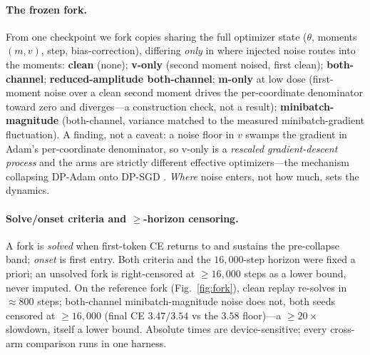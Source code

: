\documentclass[10pt]{article}
\begin{document}
\paragraph{The frozen fork.}
From one checkpoint we fork copies sharing the full optimizer state ($\theta$, moments $(m,v)$, step, bias-correction), differing \emph{only} in where injected noise routes into the moments: \textbf{clean} (none); \textbf{v-only} (second moment noised, first clean); \textbf{both-channel}; \textbf{reduced-amplitude both-channel}; \textbf{m-only} at low dose (first-moment noise over a clean second moment drives the per-coordinate denominator toward zero and diverges---a construction check, not a result); \textbf{minibatch-magnitude} (both-channel, variance matched to the measured minibatch-gradient fluctuation). A finding, not a caveat: a noise floor in $v$ swamps the gradient in Adam's per-coordinate denominator, so v-only is a \emph{rescaled gradient-descent process} and the arms are strictly different effective optimizers---the mechanism collapsing DP-Adam onto DP-SGD \citep{dpadambc,litramer}. \emph{Where} noise enters, not how much, sets the dynamics.

\paragraph{Solve/onset criteria and $\ge$-horizon censoring.}
A fork is \emph{solved} when first-token CE returns to and sustains the pre-collapse band; \emph{onset} is first entry. Both criteria and the $16{,}000$-step horizon were fixed a priori; an unsolved fork is right-censored at $\ge16{,}000$ steps as a lower bound, never imputed. On the reference fork (Fig.~\ref{fig:fork}), clean replay re-solves in $\approx800$ steps; both-channel minibatch-magnitude noise does not, both seeds censored at $\ge16{,}000$ (final CE $3.47/3.54$ vs the $3.58$ floor)---a $\ge20\times$ slowdown, itself a lower bound. Absolute times are device-sensitive; every cross-arm comparison runs in one harness.
\end{document}
